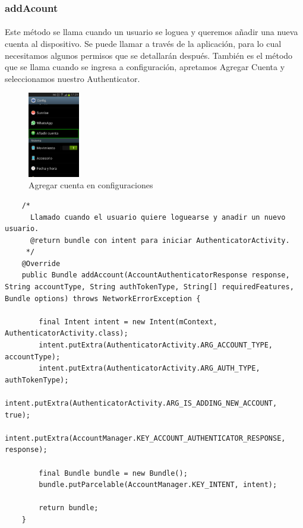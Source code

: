 \documentclass[10pt]{extarticle}
\begin{document}
\subsubsection{addAcount}
\paragraph{}
Este método se llama cuando un usuario se loguea y queremos añadir una nueva cuenta al dispositivo. Se puede llamar a través de la aplicación, para lo cual necesitamos algunos permisos que se detallarán después. También es el método que se llama cuando se ingresa a configuración, apretamos Agregar Cuenta y seleccionamos nuestro Authenticator.

\begin{figure}[H]
    \centering
    \includegraphics[width=0.2\textwidth]{agregar_cuenta_config.png}
    \caption{Agregar cuenta en configuraciones}
    \label{fig:agregar_cuenta_config}
\end{figure}

\begin{lstlisting}
    /*
      Llamado cuando el usuario quiere loguearse y anadir un nuevo usuario.
      @return bundle con intent para iniciar AuthenticatorActivity.
     */
    @Override
    public Bundle addAccount(AccountAuthenticatorResponse response, String accountType, String authTokenType, String[] requiredFeatures, Bundle options) throws NetworkErrorException {

        final Intent intent = new Intent(mContext, AuthenticatorActivity.class);
        intent.putExtra(AuthenticatorActivity.ARG_ACCOUNT_TYPE, accountType);
        intent.putExtra(AuthenticatorActivity.ARG_AUTH_TYPE, authTokenType);
        intent.putExtra(AuthenticatorActivity.ARG_IS_ADDING_NEW_ACCOUNT, true);
        intent.putExtra(AccountManager.KEY_ACCOUNT_AUTHENTICATOR_RESPONSE, response);

        final Bundle bundle = new Bundle();
        bundle.putParcelable(AccountManager.KEY_INTENT, intent);

        return bundle;
    }
\end{lstlisting}
\end{document}
